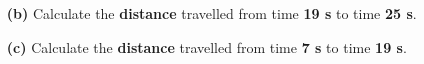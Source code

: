 \documentclass[A4,12pt]{article}
\begin{document}
\begin{enumerate}[label=\bfseries (\arabic*)]
\begin{itemize}
    \item[\bf (b)] Calculate the \textbf{distance} travelled from time \textbf{19 s} to time \textbf{25 s}.
    \item[\bf (c)] Calculate the \textbf{distance} travelled from time \textbf{7 s} to time \textbf{19 s}.

\end{itemize}
\end{enumerate}
\end{document}
